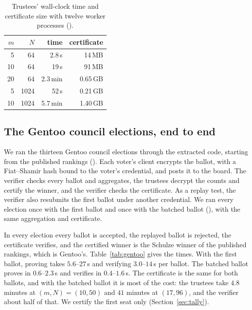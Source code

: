 \begin{table}[t]
  \caption{Trustees' wall-clock time and certificate size with twelve
  worker processes ().}
  \label{tab:par}
  \centering\scriptsize\setlength{\tabcolsep}{3pt}
  \begin{tabular}{@{}rrrr@{}}
    \toprule
    $m$ & $N$ & time & certificate \\
    \midrule
    5 & 64 & 2.8\,s & 14\,MB \\
    10 & 64 & 19\,s & 91\,MB \\
    20 & 64 & 2.3\,min & 0.65\,GB \\
    5 & 1024 & 52\,s & 0.21\,GB \\
    10 & 1024 & 5.7\,min & 1.40\,GB \\
    \bottomrule
  \end{tabular}
\end{table}


\subsection{The Gentoo council elections, end to end}\label{sec:eval:gentoo}
We ran the thirteen Gentoo council elections through the extracted code,
starting from the published rankings
().
Each voter's client encrypts the ballot, with a Fiat--Shamir hash bound
to the voter's credential, and posts it to the board. The verifier checks every ballot and
aggregates, the trustees decrypt the counts and certify the winner, and
the verifier checks the certificate. As a replay test, the verifier also
resubmits the first ballot under another credential. We ran every
election once with the first ballot and once with the batched ballot
(),
with the same aggregation and certificate.

In every election every ballot is accepted, the replayed ballot is
rejected, the certificate verifies, and the certified winner is the
Schulze winner of the published rankings, which is Gentoo's.
Table~\ref{tab:gentoo} gives the times. With the first ballot, proving
takes $5.6$--$27$\,s and verifying $3.0$--$14$\,s per ballot. The batched
ballot proves in $0.6$--$2.3$\,s and verifies in $0.4$--$1.6$\,s. The
certificate is the same for both ballots, and with the batched ballot it
is most of the cost: the trustees take $4.8$ minutes at $(m, N) = (10, 50)$ and $41$ minutes
at $(17, 96)$, and the verifier about half of that. 
We certify the first seat only (Section~\ref{sec:tally}).

